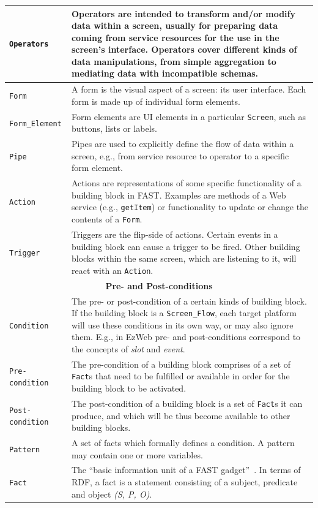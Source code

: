 \documentclass{article}
\begin{document}
\begin{small}
\begin{longtable}{|p{4.25cm}|p{10cm}|}
\texttt{Operators} & Operators are intended to transform and/or modify data within a screen, usually for preparing data coming from service resources for the use in the screen's interface. Operators cover different kinds of data manipulations, from simple aggregation to mediating data with incompatible schemas. \\ \hline
\texttt{Form} & A form is the visual aspect of a screen: its user interface. Each form is made up of individual form elements. \\ \hline
\texttt{Form\_Element} & Form elements are UI elements in a particular \texttt{Screen}, such as buttons, lists or labels. \\ \hline
\texttt{Pipe} & Pipes are used to explicitly define the flow of data within a screen, e.g., from service resource to operator to a specific form element. \\ \hline
\texttt{Action} & Actions are representations of some specific functionality of a building block in FAST. Examples are methods of a Web service (e.g., \texttt{getItem}) or functionality to update or change the contents of a \texttt{Form}. \\ \hline
\texttt{Trigger} & Triggers are the flip-side of actions. Certain events in a building block can cause a trigger to be fired. Other building blocks within the same screen, which are listening to it, will react with an \texttt{Action}. \\ \hline
\multicolumn{2}{|c|}{\textbf{Pre- and Post-conditions}} \\ \hline
\texttt{Condition} & The pre- or post-condition of a certain kinds of building block. If the building block is a \texttt{Screen\_Flow}, each target platform will use these conditions in its own way, or may also ignore them. E.g., in EzWeb pre- and post-conditions correspond to the concepts of \emph{slot} and \emph{event}. \\ \hline
\texttt{Pre-condition} & The pre-condition of a building block comprises of a set of \texttt{Fact}s that need to be fulfilled or available in order for the building block to be activated. \\ \hline
\texttt{Post-condition} & The post-condition of a building block is a set of \texttt{Fact}s it can produce, and which will be thus become available to other building blocks. \\ \hline
\texttt{Pattern} & A set of facts which formally defines a condition. A pattern may contain one or more variables. \\ \hline
\texttt{Fact} & The ``basic information unit of a FAST gadget''~\cite{urena2010fast_architecture}. In terms of RDF, a fact is a statement consisting of a subject, predicate and object \emph{(S, P, O)}. \\ \hline

\end{longtable}
\end{small}
\end{document}
